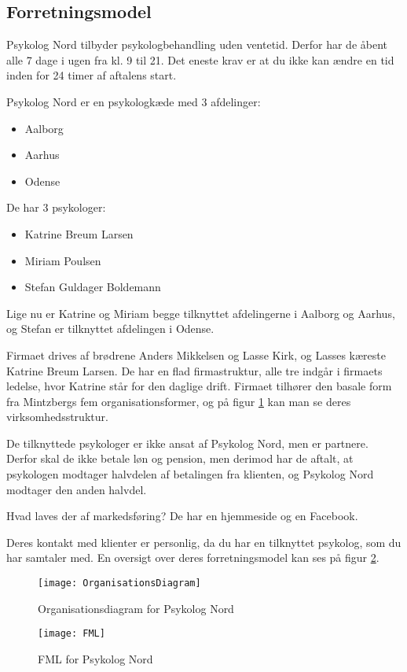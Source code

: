 \subsection{Forretningsmodel}
\label{section:forretningsmodel}

Psykolog Nord tilbyder psykologbehandling uden ventetid.
Derfor har de åbent alle 7 dage i ugen fra kl. 9 til 21. Det eneste krav er at du ikke kan ændre en tid inden for 24 timer af aftalens start.

Psykolog Nord er en psykologkæde med 3 afdelinger:
\begin{itemize}
    \item Aalborg
    \item Aarhus
    \item Odense
\end{itemize}

De har 3 psykologer:

\begin{itemize}
    \item Katrine Breum Larsen
    \item Miriam Poulsen
    \item Stefan Guldager Boldemann
\end{itemize}

Lige nu er Katrine og Miriam begge tilknyttet afdelingerne i Aalborg og Aarhus, og Stefan er tilknyttet afdelingen i Odense.


Firmaet drives af brødrene Anders Mikkelsen og Lasse Kirk, og Lasses kæreste Katrine Breum Larsen.
De har en flad firmastruktur, alle tre indgår i firmaets ledelse, hvor Katrine står for den daglige drift. 
Firmaet tilhører den basale form fra Mintzbergs fem organisationsformer, og på 
figur \ref{forretning:organisationsdiagram} kan man se deres virksomhedsstruktur.

De tilknyttede psykologer er ikke ansat af Psykolog Nord, men er partnere.
Derfor skal de ikke betale løn og pension, men derimod har de aftalt, at psykologen modtager halvdelen af betalingen fra klienten, og Psykolog Nord modtager den anden halvdel.

Hvad laves der af markedsføring? De har en hjemmeside og en Facebook.

Deres kontakt med klienter er personlig, da du har en tilknyttet psykolog, som 
du har samtaler med. En oversigt over deres forretningsmodel kan ses på figur \ref{forretning:fml}.

\begin{figure}[t]
    \caption{Organisationsdiagram for Psykolog Nord}
    \centering
        \texttt{[image: OrganisationsDiagram]}
    \label{forretning:organisationsdiagram}
\end{figure}

\begin{figure}[b]
    \caption{FML for Psykolog Nord}
    \centering
        \texttt{[image: FML]}
    \label{forretning:fml}
\end{figure}

